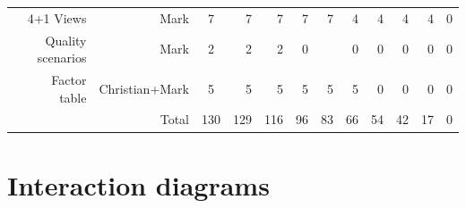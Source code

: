 \documentclass[a4paper,11pt,report]{report}
\begin{document}
\begin{landscape}
\begin{table}[htbp]
\begin{tabular}{rrrrrrrrrrrrr}
          & 4+1 Views & Mark  & \multicolumn{1}{c}{7} & 7     & 7     & 7     & 7     & 4     & 4     & 4     & 4     & 0 \\
          & Quality scenarios & Mark  & \multicolumn{1}{c}{2} & 2     & 2     & 0     &       & 0     & 0     & 0     & 0     & 0 \\
          & Factor table & Christian+Mark & \multicolumn{1}{c}{5} & 5     & 5     & 5     & 5     & 5     & 0     & 0     & 0     & 0 \\
          &       & Total & 130   & 129   & 116   & 96    & 83    & 66    & 54    & 42    & 17    & 0 \\
    \end{tabular}%
  \label{tab:addlabel}%
\end{table}%
\end{landscape}

\section{Interaction diagrams}



\end{document}
